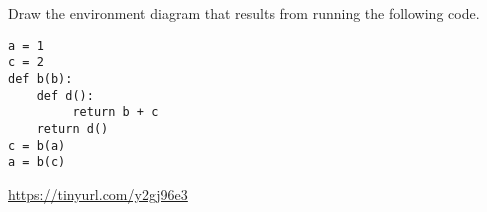 \begin{blocksection}
\question Draw the environment diagram that results from running the following code.

\begin{lstlisting}
a = 1
c = 2
def b(b):
    def d():
         return b + c
    return d()
c = b(a)
a = b(c)
\end{lstlisting}

\begin{solution}[2in]
\url{https://tinyurl.com/y2gj96e3}
\end{solution}
\end{blocksection}
